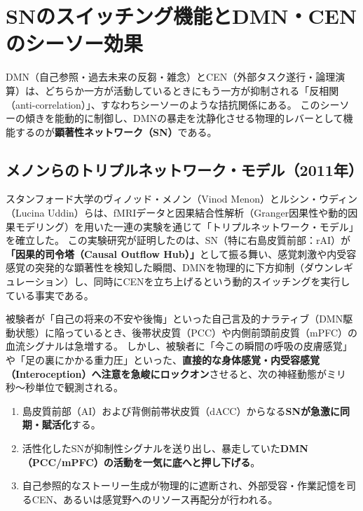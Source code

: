\section{SNのスイッチング機能とDMN・CENのシーソー効果}

DMN（自己参照・過去未来の反芻・雑念）とCEN（外部タスク遂行・論理演算）は、どちらか一方が活動しているときにもう一方が抑制される「反相関（anti-correlation）」、すなわちシーソーのような拮抗関係にある。
このシーソーの傾きを能動的に制御し、DMNの暴走を沈静化させる物理的レバーとして機能するのが\textbf{顕著性ネットワーク（SN）}である。

\subsection{メノンらのトリプルネットワーク・モデル（2011年）}
スタンフォード大学のヴィノッド・メノン（Vinod Menon）とルシン・ウディン（Lucina Uddin）らは、fMRIデータと因果結合性解析（Granger因果性や動的因果モデリング）を用いた一連の実験を通じて「トリプルネットワーク・モデル」を確立した。
この実験研究が証明したのは、SN（特に右島皮質前部：rAI）が\textbf{「因果的司令塔（Causal Outflow Hub）」}として振る舞い、感覚刺激や内受容感覚の突発的な顕著性を検知した瞬間、DMNを物理的に下方抑制（ダウンレギュレーション）し、同時にCENを立ち上げるという動的スイッチングを実行している事実である。

被験者が「自己の将来の不安や後悔」といった自己言及的ナラティブ（DMN駆動状態）に陥っているとき、後帯状皮質（PCC）や内側前頭前皮質（mPFC）の血流シグナルは急増する。
しかし、被験者に「今この瞬間の呼吸の皮膚感覚」や「足の裏にかかる重力圧」といった、\textbf{直接的な身体感覚・内受容感覚（Interoception）へ注意を急峻にロックオン}させると、次の神経動態がミリ秒〜秒単位で観測される。
\begin{enumerate}[label=(\arabic*)]
  \item 島皮質前部（AI）および背側前帯状皮質（dACC）からなる\textbf{SNが急激に同期・賦活化}する。
  \item 活性化したSNが抑制性シグナルを送り出し、暴走していた\textbf{DMN（PCC/mPFC）の活動を一気に底へと押し下げる}。
  \item 自己参照的なストーリー生成が物理的に遮断され、外部受容・作業記憶を司るCEN、あるいは感覚野へのリソース再配分が行われる。
\end{enumerate}



